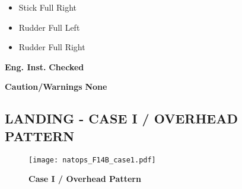 \begin{tablenumerate}
{\begin{subenumerate}
\begin{itemize}
            \item Stick Full Right
            \item Rudder Full Left
            \item Rudder Full Right
        \end{itemize}
        \item \textbf{Eng. Inst.} \dotfill \textbf{Checked}
        \item \textbf{Caution/Warnings}  \dotfill\textbf{None}
    \end{subenumerate}}
\end{tablenumerate}

\clearpage

\subsection{LANDING -  CASE I / OVERHEAD PATTERN}
\begin{figure}[h]
    \centering
    \texttt{[image: natops\_F14B\_case1.pdf]}
    \caption{\textbf{Case I / Overhead Pattern}}
    \label{fig:case1}
\end{figure}

